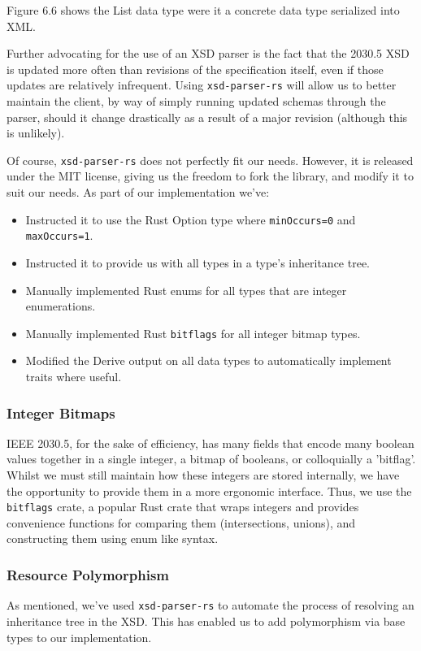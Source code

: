 Figure 6.6 shows the List data type were it a concrete data type serialized into XML.

Further advocating for the use of an XSD parser is the fact that the 2030.5 XSD is updated more often than revisions of the specification itself, even if those updates are relatively infrequent.
Using \texttt{xsd-parser-rs} will allow us to better maintain the client, by way of simply running updated schemas through the parser, should it change drastically as a result of a major revision (although this is unlikely).

Of course, \texttt{xsd-parser-rs} does not perfectly fit our needs. However, it is released under the MIT license, giving us the freedom to fork the library, and modify it to suit our needs. As part of our implementation we've:

\begin{itemize}
    \item Instructed it to use the Rust Option type where \texttt{minOccurs=0} and \texttt{maxOccurs=1}.
    \item Instructed it to provide us with all types in a type's inheritance tree.
    \item Manually implemented Rust enums for all types that are integer enumerations.
    \item Manually implemented Rust \texttt{bitflags} for all integer bitmap types.
    \item Modified the Derive output on all data types to automatically implement traits where useful.  
\end{itemize}

\subsubsection{Integer Bitmaps}
IEEE 2030.5, for the sake of efficiency, has many fields that encode many boolean values together in a single integer, a bitmap of booleans, or colloquially a 'bitflag'. Whilst we must still maintain how these integers are stored internally, we have the opportunity to provide them in a more ergonomic interface. Thus, we use the \texttt{bitflags} crate, a popular Rust crate that wraps integers and provides convenience functions for comparing them (intersections, unions), and constructing them using enum like syntax. \cite{bitflags}

\subsubsection{Resource Polymorphism}
As mentioned, we've used \texttt{xsd-parser-rs} to automate the process of resolving an inheritance tree in the XSD. This has enabled us to add polymorphism via base types to our implementation.

